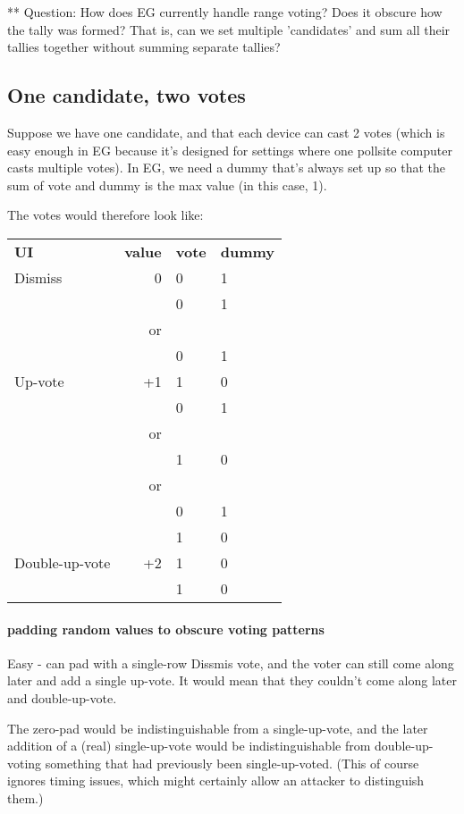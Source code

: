 \documentclass[10pt,a4paper]{article}
\begin{document}
** Question: How does EG currently handle range voting? Does it obscure how the tally was formed? That is, can we set multiple 'candidates' and sum all their tallies together without summing separate tallies?

\subsection{One candidate, two votes}
Suppose we have one candidate, and that each device can cast 2 votes (which is easy enough in EG because it's designed for settings where one pollsite computer casts multiple votes). In EG, we need a dummy that's always set up so that the sum of vote and dummy is the max value (in this case, 1).

The votes would therefore look like:

\begin{tabular}{lrll}
{\bf UI}  & {\bf value }&{\bf  vote} &{\bf  dummy }\\
Dismiss   & 0          & 0          & 1    \\
		  &            & 0          & 1    \\ 
		  & or  & & \\		  
		    &            & 0          & 1    \\ \hline
Up-vote   & +1          & 1          & 0    \\
		  &            & 0          & 1    \\   
		  & or  & & \\
		  &            & 1          & 0    \\
		  & or & & \\
		  &            & 0          & 1    \\   
		  &            & 1          & 0    \\  \hline
Double-up-vote & +2          & 1          & 0    \\
&            & 1          & 0    \\     
\end{tabular}

\paragraph{padding random values to obscure voting patterns}
Easy - can pad with a single-row Dissmis vote, and the voter can still come along later and add a single up-vote. It would mean that they couldn't come along later and double-up-vote.

The zero-pad would be indistinguishable from a single-up-vote, and the later addition of a (real) single-up-vote would be indistinguishable from double-up-voting something that had previously been single-up-voted. (This of course ignores timing issues, which might certainly allow an attacker to distinguish them.)
\end{document}

